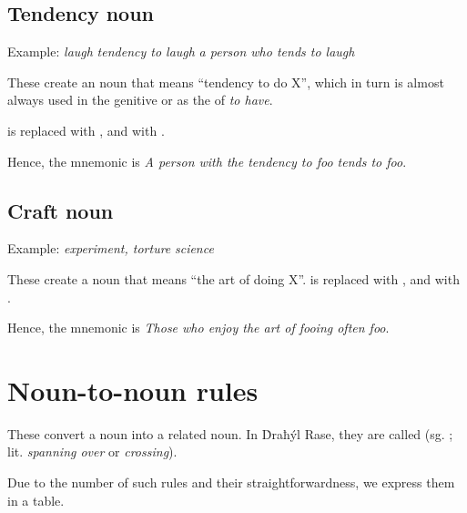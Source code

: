 \documentclass{book}
\begin{document}
\subsection{Tendency noun}

Example:  \emph{laugh} \ra{}  \emph{tendency to laugh} \ra{}  \emph{a person who tends to laugh}

These create an noun that means ``tendency to do X'', which in turn is almost always used in the genitive or as the  of  \emph{to have}.

 is replaced with , and  with .

Hence, the mnemonic is  \emph{A person with the tendency to foo tends to foo}.

\subsection{Craft noun}

Example:  \emph{experiment, torture} \ra{}  \emph{science}

These create a noun that means ``the art of doing X''.  is replaced with , and  with .

Hence, the mnemonic is  \emph{Those who enjoy the art of fooing often foo}.

\section{Noun-to-noun rules}

These convert a noun into a related noun. In Ḋraħýl Rase, they are called  (sg. ; lit. \emph{spanning over} or \emph{crossing}).

Due to the number of such rules and their straightforwardness, we express them in a table.
\end{document}
